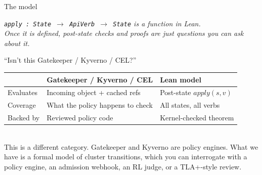 \documentclass[10pt,aspectratio=169]{beamer}
\begin{document}
\begin{frame}{The model}
\centering
{}
\vspace{0.6em}
\begin{center}
\small\itshape
\texttt{apply : State $\to$ ApiVerb $\to$ State} is a function in Lean.\\
Once it is defined, post-state checks and proofs are just questions you can ask about it.
\end{center}
\end{frame}

\begin{frame}{``Isn't this Gatekeeper / Kyverno / CEL?''}
\small
\begin{tabular}{@{}lll@{}}
\toprule
                  & \textbf{Gatekeeper / Kyverno / CEL} & \textbf{Lean model} \\
\midrule
Evaluates         & Incoming object + cached refs       & Post-state $\mathit{apply}(s,v)$ \\
Coverage          & What the policy happens to check    & All states, all verbs \\
Backed by         & Reviewed policy code                & Kernel-checked theorem \\
\bottomrule
\end{tabular}
\vspace{0.8em}\\
\small
This is a different category. Gatekeeper and Kyverno are policy engines. What we have is a formal model of cluster transitions, which you can interrogate with a policy engine, an admission webhook, an RL judge, or a TLA+-style review.
\end{frame}
\end{document}
